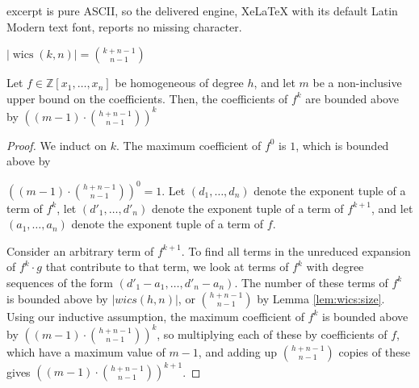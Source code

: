 \documentclass[10pt,a4paper]{amsart}
\newcommand{\wics}{\operatorname{wics}}
\begin{document}
excerpt is pure ASCII, so the delivered engine, XeLaTeX with its default Latin Modern text font, reports no missing character.
\begin{lem}
    \label{lem:wics:size}
    $|\wics(k, n)| = \binom{k + n - 1}{n - 1}$
\end{lem}

\begin{thm}
    Let $f \in \mathbb{Z}[x_1, \dots, x_n]$ be homogeneous of degree \(h\), 
    and let $m$ be a non-inclusive upper bound on the coefficients. 
    Then, the coefficients of $f ^ k$ are bounded above by 
    $\left((m - 1) \cdot \binom{h + n - 1}{n - 1}\right)^ k$
\end{thm}

\begin{proof}
    We induct on $k$. The maximum coefficient 
    of $f^0$ is $1$, which is bounded above by 
    
    \noindent$\left((m - 1) \cdot \binom{h + n - 1}{n - 1}\right)^ 0 = 1$.
    Let $(d_1, \dots , d_n)$ denote the exponent 
    tuple of a term of $f^k$, let $(d'_1, \dots , d'_n)$ 
    denote the exponent tuple of a term of 
    $f^{k + 1}$, and let $(a_1, \dots , a_n)$ 
    denote the exponent tuple of a term of $f$.

    Consider an arbitrary term of $f^{k + 1}$. 
    To find all terms in the unreduced 
    expansion of $f^k \cdot g$ that contribute 
    to that term, we look at 
    terms of $f^k$ with degree sequences of 
    the form $(d'_1 - a_1, \dots , d'_n - a_n)$. 
    The number of these terms of $f^k$ is bounded 
    above by $|wics(h, n)|$, or $\binom{h + n - 1}{n - 1}$ 
    by Lemma \ref{lem:wics:size}. Using our 
    inductive assumption, the maximum coefficient 
    of $f^k$ is bounded above by 
    $\left((m - 1) \cdot \binom{h + n - 1}{n - 1}\right)^ k$, 
    so multiplying each of these by coefficients 
    of $f$, which have a maximum value of 
    $m - 1$, and adding up $\binom{h + n - 1}{n - 1}$ 
    copies of these gives 
    $\left((m - 1) \cdot \binom{h + n - 1}{n - 1}\right)^{k + 1}$.
\end{proof}
\end{document}
